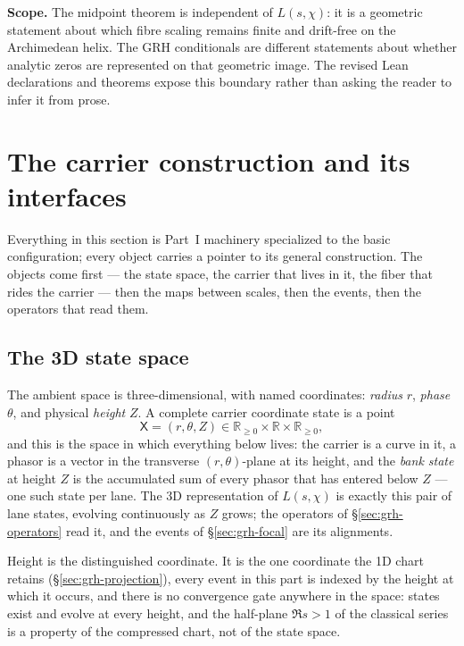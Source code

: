 \medskip
\noindent\textbf{Scope.}  The midpoint theorem is independent of
\(L(s,\chi)\): it is a geometric statement about which fibre scaling remains
finite and drift-free on the Archimedean helix.  The GRH conditionals are
different statements about whether analytic zeros are represented on that
geometric image.  The revised Lean declarations and theorems expose this
boundary rather than asking the reader to infer it from prose.

\section{The carrier construction and its interfaces}\label{sec:grh-construction}

Everything in this section is Part~I machinery specialized to the basic
configuration; every object carries a pointer to its general construction.
The objects come first --- the state space, the carrier that lives in it, the
fiber that rides the carrier --- then the maps between scales, then the
events, then the operators that read them.

\subsection{The 3D state space}\label{sec:grh-statespace}

The ambient space is three-dimensional, with named coordinates: \emph{radius}
\(r\), \emph{phase} \(\theta\), and physical \emph{height} \(Z\). A complete carrier
coordinate state is a point
\[
\mathsf X=(r,\theta,Z)\in\mathbb R_{\ge0}\times\mathbb R\times\mathbb R_{\ge0},
\]
and this is the space in which everything below lives: the carrier is a curve
in it, a phasor is a vector in the transverse \((r,\theta)\)-plane at its
height, and the \emph{bank state} at height \(Z\) is the accumulated sum of
every phasor that has entered below \(Z\) --- one such state per lane. The 3D
representation of \(L(s,\chi)\) is exactly this pair of lane states, evolving
continuously as \(Z\) grows; the operators of \S\ref{sec:grh-operators} read
it, and the events of \S\ref{sec:grh-focal} are its alignments.

Height is the distinguished coordinate. It is the one coordinate the 1D chart
retains (\S\ref{sec:grh-projection}), every event in this part is indexed by
the height at which it occurs, and there is no convergence gate anywhere in
the space: states exist and evolve at every height, and the half-plane
\(\Re s>1\) of the classical series is a property of the compressed chart,
not of the state space.

